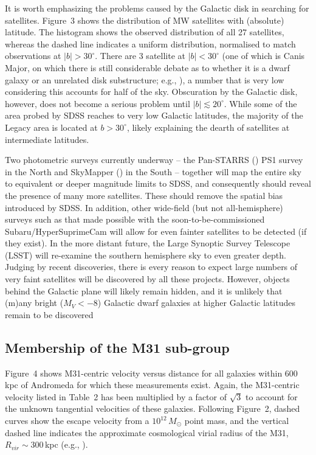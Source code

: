 \documentclass[manuscript]{aastex}
\begin{document}
It is worth emphasizing the problems caused by the Galactic disk in
searching for satellites. Figure~3 shows the distribution of MW
satellites with (absolute) latitude. The histogram shows the observed
distribution of all 27 satellites, whereas the dashed line indicates a
uniform distribution, normalised to match observations at
$|b|>30^\circ$. There are 3 satellite at $|b| < 30^\circ$ (one of
which is Canis Major, on which there is still considerable debate as
to whether it is a dwarf galaxy or an unrelated disk substructure;
e.g., \citealt{martin2004a,martin2004b,momany2004,martinezdelgado2005,moitinho2006,butler2007,lopezcorredoira2007}), a number that is very
low considering this accounts for half of the sky. Obscuration by the
Galactic disk, however, does not become a serious problem until
$|b|\lesssim20^\circ$. While some of the area probed by SDSS reaches
to very low Galactic latitudes, the majority of the Legacy area is
located at $b>30^\circ$, likely explaining the dearth of satellites at
intermediate latitudes.

Two photometric surveys currently underway -- the Pan-STARRS
(\citealt{kaiser2002}) PS1 survey in the North and SkyMapper
(\citealt{keller2007}) in the South -- together will map the entire
sky to equivalent or deeper magnitude limits to SDSS, and consequently
should reveal the presence of many more satellites. These should
remove the spatial bias introduced by SDSS. In addition, other
wide-field (but not all-hemisphere) surveys such as that made possible
with the soon-to-be-commissioned Subaru/HyperSuprimeCam will allow for
even fainter satellites to be detected (if they exist). In the more
distant future, the Large Synoptic Survey Telescope (LSST) will
re-examine the southern hemisphere sky to even greater depth. Judging
by recent discoveries, there is every reason to expect large numbers
of very faint satellites will be discovered by all these
projects. However, objects behind the Galactic plane will likely
remain hidden, and it is unlikely that (m)any bright ($M_V<-8$)
Galactic dwarf galaxies at higher Galactic latitudes remain to be
discovered

\subsection{Membership of the M31 sub-group}

Figure~4 shows M31-centric velocity versus distance for all galaxies
within 600\,kpc of Andromeda for which these measurements
exist. Again, the M31-centric velocity listed in Table~2 has been
multiplied by a factor of $\sqrt3$ to account for the unknown
tangential velocities of these galaxies. Following Figure~2, dashed
curves show the escape velocity from a $10^{12}\,M_\odot$ point mass,
and the vertical dashed line indicates the approximate cosmological
virial radius of the M31, $R_{vir} \sim 300$\,kpc (e.g.,
\citealt{klypin2002}).
\end{document}

